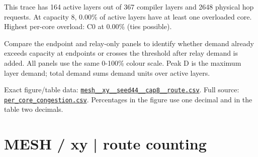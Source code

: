 \documentclass[10pt,a4paper]{article}
\begin{document}
This trace has 164 active layers out of 367 compiler layers and 2648 physical hop requests. At capacity 8, 0.00\% of active layers have at least one overloaded core. Highest per-core overload: C0 at 0.00\% (ties possible).\par
Compare the endpoint and relay-only panels to identify whether demand already exceeds capacity at endpoints or crosses the threshold after relay demand is added. All panels use the same 0-100\% colour scale. Peak D is the maximum layer demand; total demand sums demand units over active layers.\par
Exact figure/table data: \href{\detokenize{file:///home/dhruv-pansuriya/Documents/BTP/Compiler-Driven-ACE/output/pdf/qaoa_methods_congestion/tables/mesh__xy__seed44__cap8__route.csv}}{\nolinkurl{mesh__xy__seed44__cap8__route.csv}}. Full source: \href{\detokenize{file:///home/dhruv-pansuriya/Documents/BTP/Compiler-Driven-ACE/results/qaoa_2seed_2026-10-26/congestion/per_core_congestion.csv}}{\nolinkurl{per_core_congestion.csv}}. Percentages in the figure use one decimal and in the table two decimals.\par
\clearpage
\section*{MESH / xy | route counting}
\end{document}
